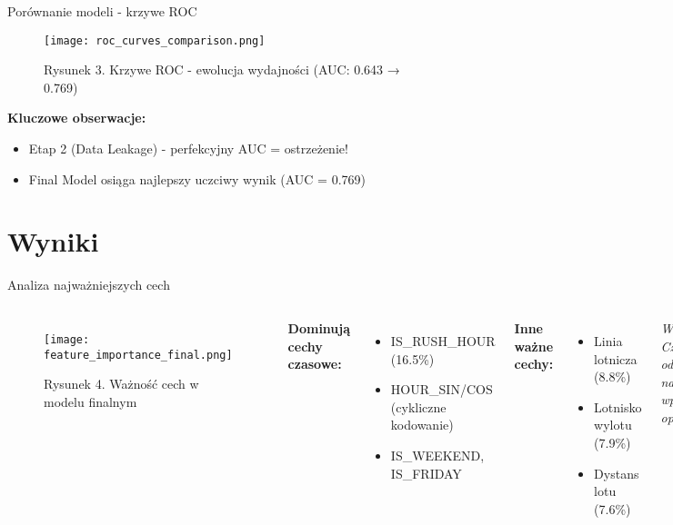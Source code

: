 \documentclass[12pt,aspectratio=169]{beamer}
\begin{document}
\begin{frame}{Porównanie modeli - krzywe ROC}
\begin{figure}
    \centering
    \texttt{[image: roc\_curves\_comparison.png]}
    \caption{Rysunek 3. Krzywe ROC - ewolucja wydajności (AUC: 0.643 → 0.769)}
\end{figure}

\textbf{Kluczowe obserwacje:}
\begin{itemize}
    \item Etap 2 (Data Leakage) - perfekcyjny AUC = ostrzeżenie!
    \item Final Model osiąga najlepszy uczciwy wynik (AUC = 0.769)
\end{itemize}
\end{frame}

\section{Wyniki}

\begin{frame}{Analiza najważniejszych cech}
\begin{columns}
\begin{figure}
    \centering
    \texttt{[image: feature\_importance\_final.png]}
    \caption{Rysunek 4. Ważność cech w modelu finalnym}
\end{figure}

\textbf{Dominują cechy czasowe:}
\begin{itemize}
    \item IS\_RUSH\_HOUR (16.5\%)
    \item HOUR\_SIN/COS (cykliczne kodowanie)
    \item IS\_WEEKEND, IS\_FRIDAY
\end{itemize}

\vspace{0.5cm}
\textbf{Inne ważne cechy:}
\begin{itemize}
    \item Linia lotnicza (8.8\%)
    \item Lotnisko wylotu (7.9\%)
    \item Dystans lotu (7.6\%)
\end{itemize}

\vspace{0.5cm}
\textit{Wniosek: Czas odlotu ma największy wpływ na opóźnienia}
\end{columns}
\end{frame}
\end{document}
